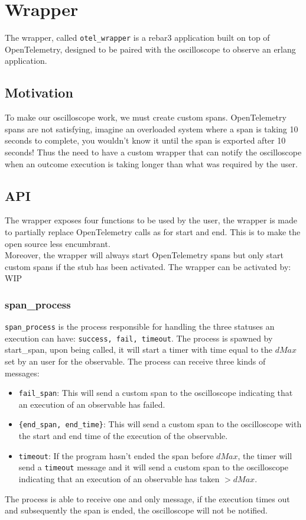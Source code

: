 \section{Wrapper}
    The wrapper, called \texttt{otel\_wrapper} is a rebar3 application built on top of OpenTelemetry, designed to be paired with the oscilloscope to observe an erlang application.
    \subsection{Motivation}
        To make our oscilloscope work, we must create custom spans. OpenTelemetry spans are not satisfying, imagine an overloaded system where a span is taking 10 seconds to complete, you wouldn't know it until the span is exported after 10 seconds! Thus the need to have a custom wrapper that can notify the oscilloscope when an outcome execution is taking longer than what was required by the user.
    \subsection{API}
        The wrapper exposes four functions to be used by the user, the wrapper is made to partially replace OpenTelemetry calls as for start and end. This is to make the open source less encumbrant. \\
        Moreover, the wrapper will always start OpenTelemetry spans but only start custom spans if the stub has been activated. The wrapper can be activated by: WIP 
        \subsubsection{span\_process}
                \texttt{span\_process} is the process responsible for handling the three statuses an execution can have: \texttt{success, fail, timeout}. The process is spawned by start\_span, upon being called, it will start a timer with time equal to the $dMax$ set by an user for the observable. 
        The process can receive three kinds of messages:
        \begin{itemize}
            \item \texttt{fail\_span}: This will send a custom span to the oscilloscope indicating that an execution of an observable has failed.
            \item \texttt{\{end\_span, end\_time\}}: This will send a custom span to the oscilloscope with the start and end time of the execution of the observable.
            \item \texttt{timeout}: If the program hasn't ended the span before $dMax$, the timer will send a \texttt{timeout} message and it will send a custom span to the oscilloscope indicating that an execution of an observable has taken $> dMax$.
        \end{itemize}
        The process is able to receive one and only message, if the execution times out and subsequently the span is ended, the oscilloscope will not be notified.
